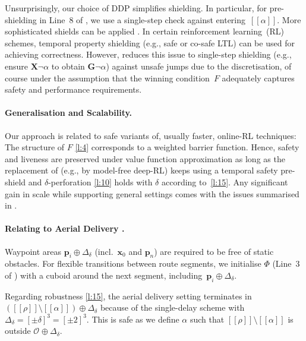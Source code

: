 \documentclass{article}
\newcommand\mcrHMQW[1]{[\![#1]\!]}
\newcommand\mAoguFS[1]{\mathbf{#1}}
\renewcommand\vec[1]{\mathbf{#1}}
\newcommand\mBuHESu[1][\delta]{\Delta_{#1}}
\newcommand\mORCysO[1][]{\mathcal{O}_{\mathsf{#1}}}
\begin{document}
{Unsurprisingly, our choice of DDP simplifies shielding.  In
particular, for pre-shielding in
Line~8 of
, we use a single-step check against
entering~$\mcrHMQW\alpha$.
More sophisticated shields can 
be applied \cite{Alshiekh2018-SafeReinforcementLearning}.
In certain 
reinforcement learning~(RL) schemes, temporal property shielding (e.g., safe or co-safe
LTL) can be used for achieving correctness.  However, 
reduces this issue to single-step shielding (e.g., ensure
$\mAoguFS{X}\neg\alpha$ to obtain $\mAoguFS{G}\neg\alpha$) against
unsafe jumps due to the discretisation, 
of course under the assumption that the winning condition~$F$
adequately captures safety and performance requirements.

\paragraph{Generalisation and Scalability.}

Our approach is related to safe variants of, usually faster, online-RL
techniques: The structure of $F$
\eqref{l:4} corresponds to a weighted barrier
function. Hence, safety and liveness are preserved under
value function approximation as long as the replacement of
 (e.g., by model-free deep-RL) keeps
using a temporal safety pre-shield and $\delta$-perforation
\eqref{l:10} holds with $\delta$ according
to~\eqref{l:15}.  Any significant gain in
scale while supporting general settings comes with the issues
summarised in
\cite[Sec.~1]{Gleirscher2025-ParametricModelOptimal}. 

\paragraph{Relating
   to Aerial
  Delivery \cite{Gleirscher2025-ParametricModelOptimal}.}

Waypoint areas ${\vec{p}}_i\oplus\mBuHESu$ (incl.\ ${{\vec{x}}_0}$ and
${\vec{p}}_n$) are required to be free of static obstacles.
For flexible transitions between route segments, we initialise
$\Phi$ (Line~3 of )
with a cuboid around the next segment,
including~${\vec{p}}_i\oplus\mBuHESu$.

Regarding robustness \eqref{l:15}, the aerial
delivery setting terminates in
$(\mcrHMQW\rho\setminus\mcrHMQW\alpha)\oplus\mBuHESu$ because of the
single-delay scheme with $\mBuHESu=[\pm\delta]^3=[\pm 2]^3$.
This is safe as we define $\alpha$ such that 
$\mcrHMQW\rho\setminus\mcrHMQW\alpha$ is outside
$\mORCysO\oplus\mBuHESu$.

}
\end{document}
